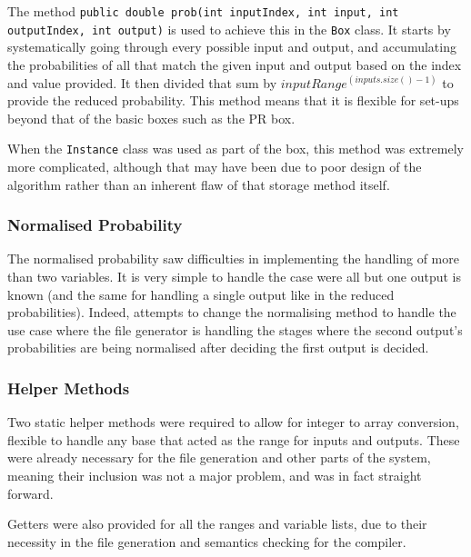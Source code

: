 \documentclass[report.tex]{subfiles}
\begin{document}
The method \texttt{public double prob(int inputIndex, int input,
int outputIndex, int output)} is used to achieve this in the \texttt{Box} class.
It starts by systematically going through every possible input and output, and
accumulating the probabilities of all that match the given input and output
based on the index and value provided. It then divided that sum by
\(inputRange ^ (inputs.size() - 1)\) to provide the reduced probability. This
method means that it is flexible for set-ups beyond that of the basic boxes such
as the PR box.

When the \texttt{Instance} class was used as part of the box, this method was
extremely more complicated, although that may have been due to poor design of
the algorithm rather than an inherent flaw of that storage method itself.

\subsubsection{Normalised Probability} %
\label{ssub:normalised_probability}
The normalised probability saw difficulties in implementing the handling of more
than two variables. It is very simple to handle the case were all but one output
is known (and the same for handling a single output like in the reduced
probabilities). Indeed, attempts to change the normalising method to handle the
use case where the file generator is handling the stages where the second
output's probabilities are being normalised after deciding the first output is
decided.

 


\subsubsection{Helper Methods} %
\label{ssub:helper_methods}
Two static helper methods were required to allow for integer to array
conversion, flexible to handle any base that acted as the range for inputs and
outputs. These were already necessary for the file generation and other parts
of the system, meaning their inclusion was not a major problem, and was in fact
straight forward.

Getters were also provided for all the ranges and variable lists, due to their
necessity in the file generation and semantics checking for the compiler.
\end{document}
